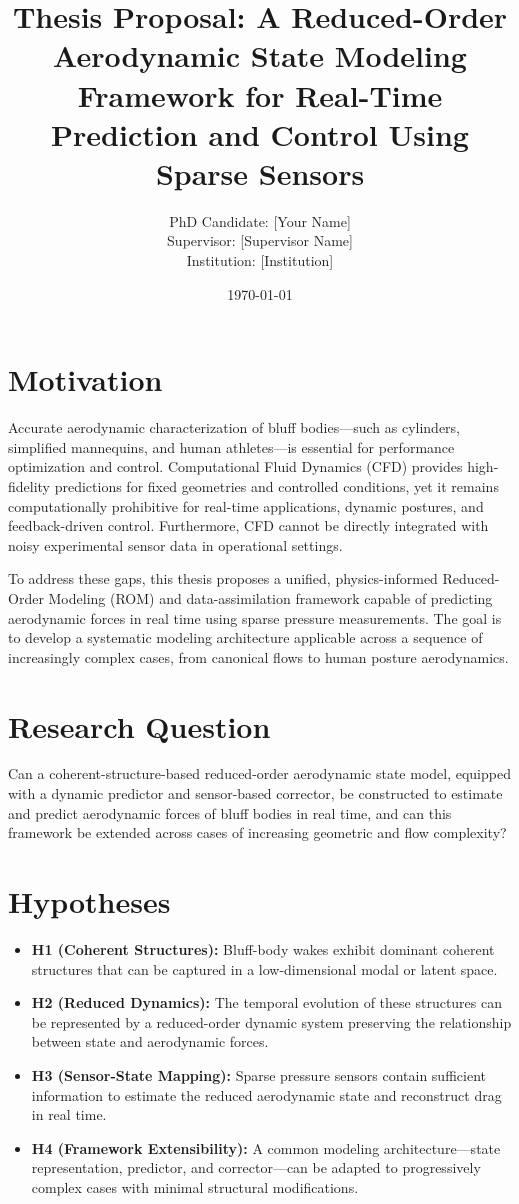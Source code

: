 \documentclass[12pt]{article}
\title{\textbf{Thesis Proposal: A Reduced-Order Aerodynamic State Modeling Framework for Real-Time Prediction and Control Using Sparse Sensors}}
\author{PhD Candidate: [Your Name] \\ Supervisor: [Supervisor Name] \\ Institution: [Institution]}
\date{\today}
\begin{document}
\maketitle

\section{Motivation}
Accurate aerodynamic characterization of bluff bodies---such as cylinders, simplified mannequins, and human athletes---is essential for performance optimization and control. Computational Fluid Dynamics (CFD) provides high-fidelity predictions for fixed geometries and controlled conditions, yet it remains computationally prohibitive for real-time applications, dynamic postures, and feedback-driven control. Furthermore, CFD cannot be directly integrated with noisy experimental sensor data in operational settings.

To address these gaps, this thesis proposes a unified, physics-informed Reduced-Order Modeling (ROM) and data-assimilation framework capable of predicting aerodynamic forces in real time using sparse pressure measurements. The goal is to develop a systematic modeling architecture applicable across a sequence of increasingly complex cases, from canonical flows to human posture aerodynamics.

\section{Research Question}
Can a coherent-structure-based reduced-order aerodynamic state model, equipped with a dynamic predictor and sensor-based corrector, be constructed to estimate and predict aerodynamic forces of bluff bodies in real time, and can this framework be extended across cases of increasing geometric and flow complexity?

\section{Hypotheses}
\begin{itemize}
    \item \textbf{H1 (Coherent Structures):} Bluff-body wakes exhibit dominant coherent structures that can be captured in a low-dimensional modal or latent space.
    \item \textbf{H2 (Reduced Dynamics):} The temporal evolution of these structures can be represented by a reduced-order dynamic system preserving the relationship between state and aerodynamic forces.
    \item \textbf{H3 (Sensor-State Mapping):} Sparse pressure sensors contain sufficient information to estimate the reduced aerodynamic state and reconstruct drag in real time.
    \item \textbf{H4 (Framework Extensibility):} A common modeling architecture---state representation, predictor, and corrector---can be adapted to progressively complex cases with minimal structural modifications.
\end{itemize}
\end{document}
